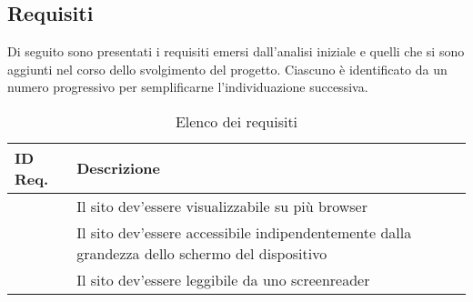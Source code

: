 {	\subsection{Requisiti}{
		Di seguito sono presentati i requisiti emersi dall'analisi iniziale e quelli che si sono aggiunti nel corso dello svolgimento del progetto. Ciascuno è identificato da un numero progressivo per semplificarne l'individuazione successiva.\\
		\newcommand\rownumber{\stepcounter{magicrownumbers}\arabic{magicrownumbers}}
		\begin{table}[h]
			\centering
			\begin{tabular}{|p{}|p{}|}
				\hline
			 	\textbf{ID Req.} & \textbf{Descrizione}\\
				\hline
				\centering \rownumber	&	Il sito dev'essere visualizzabile su più browser\\
				\hline
				\rownumber	&	Il sito dev'essere accessibile indipendentemente dalla grandezza dello schermo del dispositivo\\
				\hline
				\rownumber	&	Il sito dev'essere leggibile da uno screenreader\\
				\hline
			\end{tabular}
			\label{tab:requisiti}
			\caption{Elenco dei requisiti}
		\end{table}
	}
}